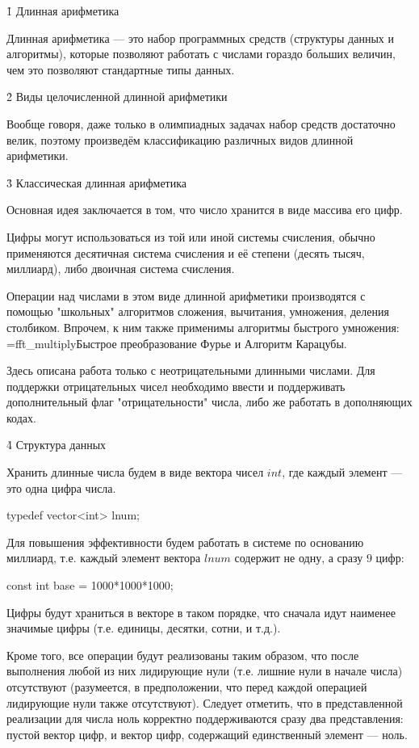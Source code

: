 \h1{ Длинная арифметика }

Длинная арифметика --- это набор программных средств (структуры данных и алгоритмы), которые позволяют работать с числами гораздо больших величин, чем это позволяют стандартные типы данных.


\h2{ Виды целочисленной длинной арифметики }

Вообще говоря, даже только в олимпиадных задачах набор средств достаточно велик, поэтому произведём классификацию различных видов длинной арифметики.


\h3{ Классическая длинная арифметика }

Основная идея заключается в том, что число хранится в виде массива его цифр.

Цифры могут использоваться из той или иной системы счисления, обычно применяются десятичная система счисления и её степени (десять тысяч, миллиард), либо двоичная система счисления.

Операции над числами в этом виде длинной арифметики производятся с помощью "школьных" алгоритмов сложения, вычитания, умножения, деления столбиком. Впрочем, к ним также применимы алгоритмы быстрого умножения: \algohref=fft_multiply{Быстрое преобразование Фурье} и Алгоритм Карацубы.

Здесь описана работа только с неотрицательными длинными числами. Для поддержки отрицательных чисел необходимо ввести и поддерживать дополнительный флаг "отрицательности" числа, либо же работать в дополняющих кодах.


\h4{ Структура данных }

Хранить длинные числа будем в виде вектора чисел $int$, где каждый элемент --- это одна цифра числа.

\code
typedef vector<int> lnum;
\endcode

Для повышения эффективности будем работать в системе по основанию миллиард, т.е. каждый элемент вектора $lnum$ содержит не одну, а сразу $9$ цифр:

\code
const int base = 1000*1000*1000;
\endcode

Цифры будут храниться в векторе в таком порядке, что сначала идут наименее значимые цифры (т.е. единицы, десятки, сотни, и т.д.).

Кроме того, все операции будут реализованы таким образом, что после выполнения любой из них лидирующие нули (т.е. лишние нули в начале числа) отсутствуют (разумеется, в предположении, что перед каждой операцией лидирующие нули также отсутствуют). Следует отметить, что в представленной реализации для числа ноль корректно поддерживаются сразу два представления: пустой вектор цифр, и вектор цифр, содержащий единственный элемент --- ноль.



